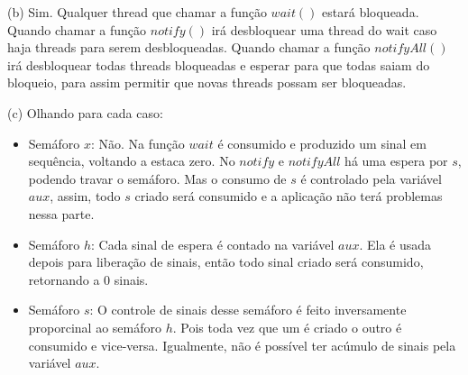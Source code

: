 \documentclass{homework}
\begin{document}
(b) Sim. Qualquer thread que chamar a função $wait()$ estará bloqueada. Quando chamar a função $notify()$ irá desbloquear uma thread do wait caso haja threads para serem desbloqueadas. Quando chamar a função $notifyAll()$ irá desbloquear todas threads bloqueadas e esperar para que todas saiam do bloqueio, para assim permitir que novas threads possam ser bloqueadas. 

(c) Olhando para cada caso:
\begin{itemize}
    \item Semáforo $x$: Não. Na função $wait$ é consumido e produzido um sinal em sequência, voltando a estaca zero. No $notify$ e $notifyAll$ há uma espera por $s$, podendo travar o semáforo. Mas o consumo de $s$ é controlado pela variável $aux$, assim, todo $s$ criado será consumido e a aplicação não terá problemas nessa parte.
    \item Semáforo $h$: Cada sinal de espera é contado na variável $aux$. Ela é usada depois para liberação de sinais, então todo sinal criado será consumido, retornando a 0 sinais.
    \item Semáforo $s$: O controle de sinais desse semáforo é feito inversamente proporcinal ao semáforo $h$. Pois toda vez que um é criado o outro é consumido e vice-versa. Igualmente, não é possível ter acúmulo de sinais pela variável $aux$.
\end{itemize}
\end{document}
